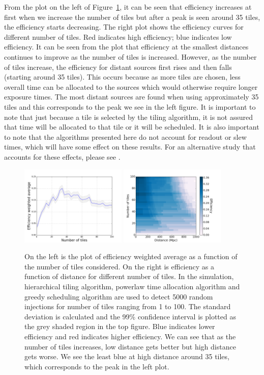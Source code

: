 \documentclass[twocolumn]{aastex62}
\begin{document}
From the plot on the left of Figure~\ref{fig:eff_ntiles}, it can be seen that efficiency increases at first when we increase the number of tiles but after a peak is seen around 35 tiles, the efficiency starts decreasing. The right plot shows the efficiency curves for different number of tiles. Red indicates high efficiency; blue indicates low efficiency. It can be seen from the plot that efficiency at the smallest distances continues to improve as the number of tiles is increased. However, as the number of tiles increase, the efficiency for distant sources first rises and then falls (starting around 35 tiles). This occurs because as more tiles are chosen, less overall time can be allocated to the sources which would otherwise require longer exposure times. The most distant sources are found when using approximately 35 tiles and this corresponds to the peak we see in the left figure.
It is important to note that just because a tile is selected by the tiling algorithm, it is not assured that time will be allocated to that tile or it will be scheduled.
It is also important to note that the algorithms presented here do not account for readout or slew times, which will have some effect on these results. For an alternative study that accounts for these effects, please see \cite{ChHu2017}.
\begin{figure}[t]
    \centering
    \includegraphics[width=0.45\textwidth]{plots/eff_ntiles.png}
    \includegraphics[width=0.45\textwidth]{plots/eff_pcolor.png}
    \caption{On the left is the plot of efficiency weighted average as a function of the number of tiles considered. On the right is efficiency as a function of distance for different number of tiles. In the simulation, hierarchical tiling algorithm, powerlaw time allocation algorithm and greedy scheduling algorithm are used to detect 5000 random injections for number of tiles ranging from 1 to 100. The standard deviation is calculated and the 99\% confidence interval is plotted as the grey shaded region in the top figure. Blue indicates lower efficiency and red indicates higher efficiency. We can see that as the number of tiles increases, low distance gets better but high distance gets worse. We see the least blue at high distance around 35 tiles, which corresponds to the peak in the left plot.}
    \label{fig:eff_ntiles}
\end{figure}
\end{document}

